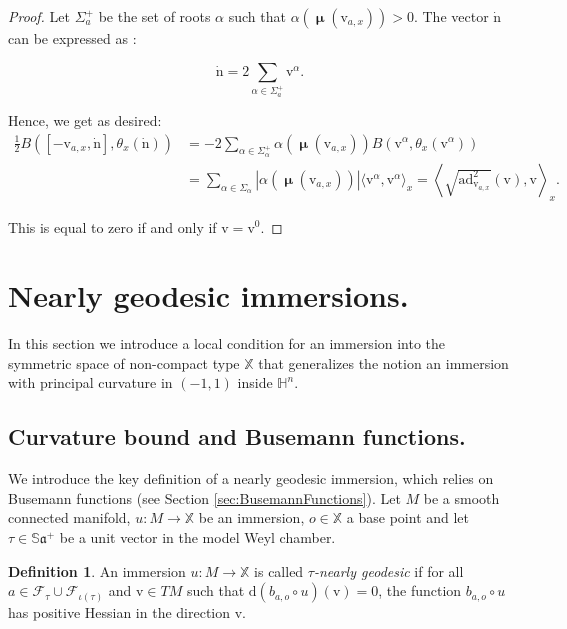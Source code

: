 \documentclass[reqno,10pt]{amsart}
\theoremstyle{plain}
\theoremstyle{definition}
\newtheorem{defn}[thm]{Definition}
\theoremstyle{remark}
\newcommand{\type}{\tau}
\newcommand{\Sph}{\mathbb{S}}
\DeclareMathOperator{\Cartan}{\boldsymbol{\mu}}
\DeclareMathOperator{\ad}{ad}
\newcommand{\X}{\mathbb{X}}
\begin{document}
\begin{proof}
Let $\Sigma^{+}_a$ be the set of roots  $\alpha$ such that $\alpha(\Cartan(\mathrm{v}_{a,x}))> 0$. The vector $\dot{\mathrm{n}}$ can be expressed as :

$$\dot{\mathrm{n}}= 2\sum_{\alpha\in \Sigma_a^{+}}\mathrm{v}^\alpha.$$

Hence, we get as desired:
\begin{equation} \label{eq1}
\begin{split}
	\frac{1}{2} B([-\mathrm{v}_{a,x},\dot{\mathrm{n}}],\theta_x(\dot{\mathrm{n}}))
		&  
	= -2\sum_{\alpha\in \Sigma^+_\alpha}\alpha(\Cartan(\mathrm{v}_{a,x}))B(\mathrm{v}^\alpha, \theta_x(\mathrm{v}^\alpha))
		\\
		& 
	=\sum_{\alpha\in \Sigma_\alpha}|\alpha(\Cartan(\mathrm{v}_{a,x}))|\langle \mathrm{v}^\alpha,\mathrm{v}^\alpha\rangle_x 
	=\left\langle\sqrt{\ad_{\mathrm{v}_{a,x}}^2}(\mathrm{v}),\mathrm{v}\right\rangle_x.
\end{split}
\end{equation}

\medskip

This is equal to zero if and only if $\mathrm{v}=\mathrm{v}^0$.
\end{proof}

\section{Nearly geodesic immersions.}

In this section we introduce a local condition for an immersion into the symmetric space of non-compact type $\X$ that generalizes the notion an immersion with principal curvature in $(-1,1)$ inside $\mathbb{H}^n$. 

\label{sec:nearlygeodesic}
\subsection{Curvature bound and Busemann functions.}


We introduce the key definition of a nearly geodesic immersion, which relies on Busemann functions (see Section \ref{sec:BusemannFunctions}).
Let $M$ be a smooth connected manifold, $u:M\to \X$ be an immersion, $o\in \X$ a base point and let $\type\in \Sph\mathfrak{a}^+$ be a unit vector in the model Weyl chamber.

\begin{defn}

\label{Defn:NearlyGeodesicSurface}
An immersion $u: M\to \X$ is called \emph{$\type$-nearly geodesic} if for all $a\in \mathcal{F}_\type\cup \mathcal{F}_{\iota(\type)}$ and $\mathrm{v}\in TM$ such that $\mathrm{d}(b_{a,o}\circ u)(\mathrm{v})=0$, the function $b_{a,o}\circ u$ has positive Hessian in the direction $\mathrm{v}$.
\end{defn}
\end{document}
